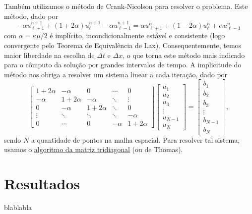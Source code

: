 \documentclass[twocolumn,showpacs,%
  nofootinbib,aps,superscriptaddress,%
  eqsecnum,prd,notitlepage,showkeys,10pt]{revtex4-1} %
\begin{document}
	Também utilizamos o método de Crank-Nicolson para resolver o problema.
	Este método, dado por
	\begin{equation}
		\label{eq:crank-nicolson}
		-\alpha u^{n+1}_{\ell + 1} + (1 + 2\alpha)u^{n+1}_{\ell} - \alpha u^{n+1}_{\ell - 1}
		= \alpha u^{n}_{\ell + 1} + (1 - 2\alpha)u^{n}_{\ell} + \alpha u^{n}_{\ell - 1}
	\end{equation}
	com $\alpha = \kappa\mu/2$ é implícito, incondicionalmente estável e consistente
	(logo convergente pelo Teorema de Equivalência de Lax).
	Consequentemente, temos maior liberdade na escolha de $\Delta t$ e $\Delta x$, o que torna
	este método mais indicado para o cômputo da solução por grandes intervalos de tempo.
	A implicitude do método nos obriga a resolver um sistema linear a cada iteração,
	dado por
	\begin{equation}
		\begin{bmatrix}
			1 + 2\alpha & -\alpha & 0 & \cdots & 0 \\
			-\alpha & 1 + 2\alpha & -\alpha & \ddots & \vdots \\
			0 & -\alpha & 1 + 2\alpha & \ddots & 0 \\
			\vdots & \ddots & \ddots & \ddots & -\alpha \\
			0 & \cdots & 0 & -\alpha & 1 + 2\alpha
		\end{bmatrix}
		\begin{bmatrix}
			u_1 \\
			u_2 \\
			u_3 \\
			\vdots \\
			u_{N-1} \\
			u_N
		\end{bmatrix}
		=
		\begin{bmatrix}
			b_1 \\
			b_2 \\
			b_3 \\
			\vdots \\
			b_{N-1} \\
			b_N
		\end{bmatrix},
	\end{equation}
	sendo $N$ a quantidade de pontos na malha espacial.
	Para resolver tal sistema, usamos o \href{https://en.wikipedia.org/wiki/Tridiagonal_matrix_algorithm}{algoritmo da matriz tridiagonal}
	(ou de Thomas).
%
\section{Resultados}
%
	blablabla
\end{document}
